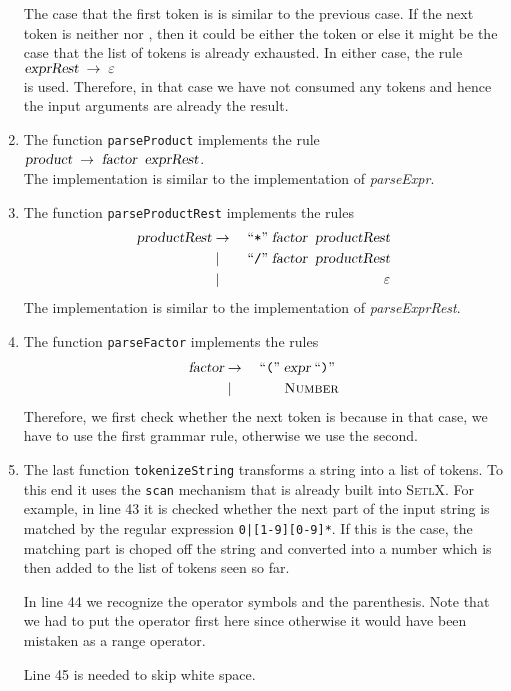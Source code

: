 \begin{enumerate}
      The case that the first token is \squoted{-} is similar to the previous case.
      If the next token is neither \squoted{+} nor \squoted{-}, then it could be either the
      token \squoted{)} or else it might be the case that the list of tokens is already
      exhausted.  In either case, the rule
      \\[0.2cm]
      \hspace*{1.3cm}
      $\textsl{exprRest} \;\rightarrow\; \varepsilon$
      \\[0.2cm]
      is used.  Therefore, in that case we have not consumed any tokens and hence
      the input arguments are already the result.
\item The function \texttt{parseProduct} implements the rule
      \\[0.2cm]
      \hspace*{1.3cm}
      $\textsl{product} \;\rightarrow\; \textsl{factor} \;\; \textsl{exprRest}$.
      \\[0.2cm]
      The implementation is similar to the implementation of \textsl{parseExpr}.
\item The function \texttt{parseProductRest} implements the rules
      \begin{eqnarray*}
      \textsl{productRest} & \rightarrow & \;\mbox{``\texttt{*}''}\; \textsl{factor}\;\;\textsl{productRest} \\
                       & \mid        & \;\mbox{``\texttt{/}''}\; \textsl{factor}\;\;\textsl{productRest}     \\
                       & \mid        & \;\varepsilon                                      
      \end{eqnarray*}
      The implementation is similar to the implementation of \textsl{parseExprRest}.
\item The function \texttt{parseFactor} implements the rules
      \begin{eqnarray*}
      \textsl{factor} & \rightarrow & \;\mbox{``\texttt{(}''}\; \textsl{expr} \;\mbox{``\texttt{)}''}\; \\
                      & \mid        & \;\textsc{Number} 
      \end{eqnarray*}
      Therefore, we first check whether the next token is \squoted{(} because in that case,
      we have to use the first grammar rule, otherwise we use the second.
\item The last function \texttt{tokenizeString} transforms a string into a list of tokens.
      To this end it uses the \texttt{scan} mechanism that is already built into
      \textsc{SetlX}.  For example, in line 43 it is checked whether the next part of the
      input string is matched by the regular expression \verb"0|[1-9][0-9]*".  If this is
      the case, the matching part is choped off the string and converted into a number
      which is then added to the list of tokens seen so far.

      In line 44 we recognize the operator symbols and the parenthesis.  Note that we had
      to put the operator \squoted{-} first here since otherwise it would have been
      mistaken as a range operator.

      Line 45 is needed to skip white space.
\end{enumerate}
